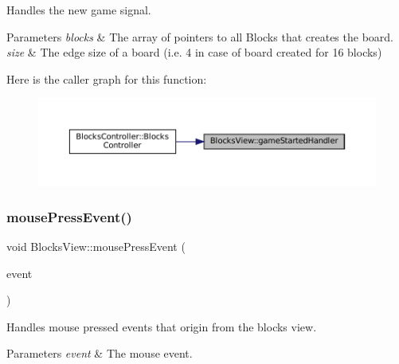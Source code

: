Handles the new game signal. 


\begin{DoxyParams}{Parameters}
{\em blocks} & The array of pointers to all Blocks that creates the board. \\
\hline
{\em size} & The edge size of a board (i.\+e. 4 in case of board created for 16 blocks) \\
\hline
\end{DoxyParams}
Here is the caller graph for this function\+:
\nopagebreak
\begin{figure}[H]
\begin{center}
\leavevmode
\includegraphics[width=350pt]{class_blocks_view_a23c0b8242274f9627a91dba5fa8af036_icgraph}
\end{center}
\end{figure}
\mbox{\label{class_blocks_view_a9131c975ebe8b9c6933890bb9d9b0848}} 
\subsubsection{\texorpdfstring{mousePressEvent()}{mousePressEvent()}}
{\footnotesize\ttfamily void Blocks\+View\+::mouse\+Press\+Event (\begin{DoxyParamCaption}\item[{Q\+Mouse\+Event $\ast$}]{event }\end{DoxyParamCaption})\hspace{0.3cm}{\ttfamily [protected]}}



Handles mouse pressed events that origin from the blocks view. 


\begin{DoxyParams}{Parameters}
{\em event} & The mouse event. \\
\hline
\end{DoxyParams}
\mbox{\label{class_blocks_view_aac769b83129ef5e37c4ab6c680cc13a1}} 
